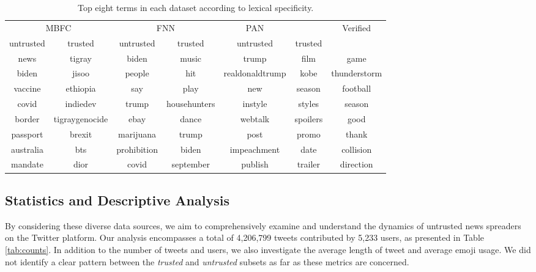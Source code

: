 \begin{table}[ht]
\begin{adjustbox}{width=\textwidth,center}
\begin{tabular}{cc|cc|cc|c}
\multicolumn{2}{c|}{MBFC}  & \multicolumn{2}{c|}{FNN}   & PAN             &          & \multirow{2}{*}{Verified} \\ \cline{1-6}
untrusted      & trusted           & untrusted        & trusted         & untrusted            & trusted     &                           \\ \hline
news      & tigray         & biden       & music        & trump           & film     & game                      \\
biden     & jisoo          & people      & hit          & realdonaldtrump & kobe     & thunderstorm              \\
vaccine   & ethiopia       & say         & play         & new             & season   & football                  \\
covid     & indiedev       & trump       & househunters & instyle         & styles   & season                    \\
border    & tigraygenocide & ebay        & dance        & webtalk         & spoilers & good                      \\
passport  & brexit         & marijuana   & trump        & post            & promo    & thank                     \\
australia & bts            & prohibition & biden        & impeachment     & date     & collision                 \\
mandate   & dior           & covid       & september    & publish         & trailer  & direction                 \\
                 
\end{tabular}
\end{adjustbox}
\caption{Top eight terms in each dataset according to lexical specificity.}
\label{tab:lexspec}
\end{table}

\subsection{Statistics and Descriptive Analysis}

 By considering these diverse data sources, we aim to comprehensively examine and understand the dynamics of untrusted news spreaders on the Twitter platform. Our analysis encompasses a total of 4,206,799 tweets contributed by 5,233 users, as presented in Table \ref{tab:counts}. In addition to the number of tweets and users, we also investigate the average length of tweet and average emoji usage. We did not identify a clear pattern between the \textit{trusted} and \textit{untrusted} subsets as far as these metrics are concerned. 


